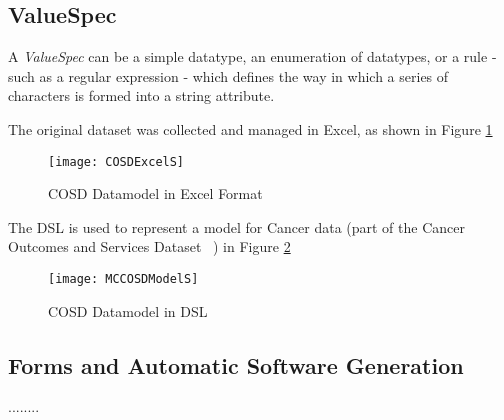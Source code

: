 \subsection{ValueSpec}
A \emph{ValueSpec} can be a simple datatype, an enumeration of datatypes, or a rule - such as a regular expression - which defines the way in which a series of characters is formed into a string attribute. 



The original dataset was collected and managed in Excel, as shown in Figure \ref{fig:excelCOSD}

\begin{figure}[here]
	\texttt{[image: COSDExcelS]}
	\caption{COSD Datamodel in Excel Format} 
	\label{fig:excelCOSD}
\end{figure}
The DSL is used to represent a model for Cancer data (part of the Cancer Outcomes and Services Dataset ~\cite{COSD}) in Figure \ref{fig:elmcosd}

\begin{figure}[here]
	\texttt{[image: MCCOSDModelS]}
	\caption{COSD Datamodel in DSL} 
	\label{fig:elmcosd}
\end{figure}



\subsection{Forms and Automatic Software Generation}


........


